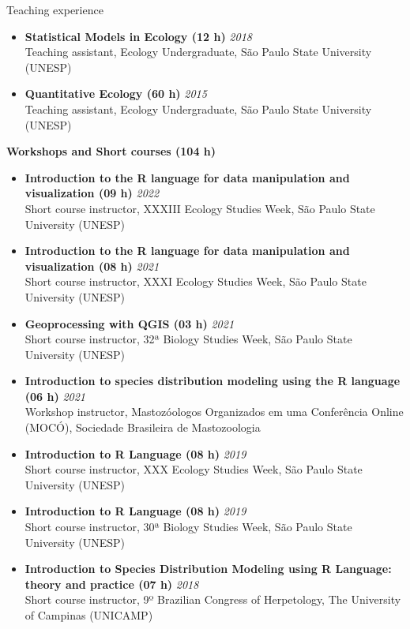 \documentclass{resume}
\begin{document}
\begin{rSection}{Teaching experience}
\begin{itemize}
\item {\bf Statistical Models in Ecology (12 h)} \hfill{\em 2018} 
\\ Teaching assistant, Ecology Undergraduate, São Paulo State University (UNESP)

\item {\bf Quantitative Ecology (60 h)} \hfill{\em 2015} 
\\ Teaching assistant, Ecology Undergraduate, São Paulo State University (UNESP)
\end{itemize}

{\bf Workshops and Short courses (104 h)}
\begin{itemize}
\item {\bf Introduction to the R language for data manipulation and visualization (09 h)} \hfill{\em 2022} 
\\ Short course instructor, XXXIII Ecology Studies Week, São Paulo State University (UNESP)

\item {\bf Introduction to the R language for data manipulation and visualization (08 h)} \hfill{\em 2021} 
\\ Short course instructor, XXXI Ecology Studies Week, São Paulo State University (UNESP)

\item {\bf Geoprocessing with QGIS (03 h)} \hfill{\em 2021} 
\\ Short course instructor, 32ª Biology Studies Week, São Paulo State University (UNESP)

\item {\bf Introduction to species distribution modeling using the R language (06 h)} \hfill{\em 2021} 
\\ Workshop instructor, Mastozóologos Organizados em uma Conferência Online (MOCÓ), Sociedade Brasileira de Mastozoologia

\item {\bf Introduction to R Language (08 h)} \hfill{\em 2019} 
\\ Short course instructor, XXX Ecology Studies Week, São Paulo State University (UNESP) 

\item {\bf Introduction to R Language (08 h)} \hfill{\em 2019} 
\\ Short course instructor, 30ª Biology Studies Week, São Paulo State University (UNESP)

\item {\bf Introduction to Species Distribution Modeling using R Language: theory and practice (07 h)} \hfill{\em 2018} 
\\ Short course instructor, 9º Brazilian Congress of Herpetology, The University of Campinas (UNICAMP)


\end{itemize}
\end{rSection}
\end{document}
